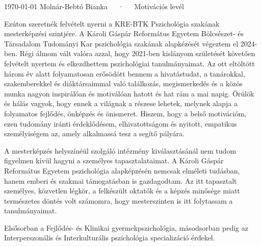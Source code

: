 \documentclass[11pt, a4paper]{awesome-cv}
\begin{document}
\makecvheader[R]

\makecvfooter
  {\today}
  {Molnár-Bebtó Bianka~~~·~~~Motivációs levél}
  {}

\makelettertitle

\begin{cvletter}

Ezúton szeretnék felvételt nyerni a KRE-BTK Pszichológia szakának mesterképzési szintjére. A Károli Gáspár Református Egyetem Bölcsészet- és Társadalom Tudományi Kar pszichológia szakának alapkézését végeztem el 2024-ben. Régi álmom vált valóra azzal, hogy 2021-ben kislányom születését követően felvételt nyertem és elkezdhettem pszichológiai tanulmányaimat. Az ott eltöltött három év alatt folyamatosan erősödött bennem a hivatástudat, a tanárokkal, szakemberekkel és diáktársaimmal való találkozás, megismerkedés és a közös munka nagyon inspirálóan és motiválóan hatott és hat rám a mai napig. Örülök és hálás vagyok, hogy ennek a világnak a részese lehetek, melynek alapja a folyamatos fejlődés, önképzés és önismeret. Hiszem, hogy a belső motivációm, ezen tudomány iránti érdeklődésem, elhivatottságom és nyitott, empatikus személyiségem az, amely alkalmassá tesz a segítő pályára.



A mesterképzés helyszínéül szolgáló intézmény kiválasztásánál nem tudom figyelmen kívül hagyni a személyes tapasztalataimat. A Károli Gáspár Református Egyetem pszichológia alapképzésén nemcsak elméleti tudásban, hanem emberi és szakmai támogatásban is gazdagodtam. Az itt tapasztalt személyes, közvetlen légkör, a felkészült oktatók és a képzés minősége miatt természetes döntés volt számomra, hogy mesterszinten is itt folytassam a tanulmányaimat.



Elsősorban a Fejlődés- és Klinikai gyermekpszichológia, másodsorban pedig az Interperszonális és Interkulturális pszichológia specializáció érdekel.


\end{cvletter}


\makeletterclosing
\end{document}
